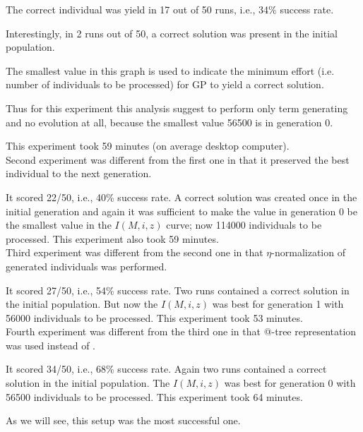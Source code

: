 \documentclass[12pt,a4paper]{report}
\makeatletter
\newcommand{\atTree}{@-tree\xspace}
\makeatother
\begin{document}
The correct individual was yield 
in 17 out of 50 runs, i.e., 34\% success rate.


Interestingly, in 2 runs out of 50, a correct solution was present in the initial population.


The smallest value in this graph is used to indicate the minimum effort
(i.e. number of individuals to be processed) for GP to yield a correct solution.

Thus for this experiment this analysis suggest
to perform only term generating and no evolution at all, 
because the smallest value 56500 is in generation 0.

This experiment took 59 minutes (on average desktop computer).\\

Second experiment was different from the first one in that it 
preserved the best individual to the next generation.

It scored 22/50, i.e., 40\% success rate. A correct solution was
created once in the initial generation and again it was
sufficient to make the value in generation 0
be the smallest value in the $I(M,i,z)$ curve; now 114000
 individuals to be processed.
This experiment also took 59 minutes.\\


Third experiment was different from the second one in that 
$\eta$-normalization of generated individuals was performed.

It scored 27/50, i.e., 54\% success rate. 
Two runs contained a correct solution in the initial population.
But now the $I(M,i,z)$ was best for generation 1 with 56000
 individuals to be processed.
This experiment took 53 minutes.\\


Fourth experiment was different from the third one in that
\atTree representation was used instead of \sexprTree.

It scored 34/50, i.e., 68\% success rate. Again two runs
contained a correct solution in the initial population.
The $I(M,i,z)$ was best for generation 0 with 56500 
individuals to be processed.
This experiment took 64 minutes.

As we will see, this setup was the most successful one.
\end{document}
